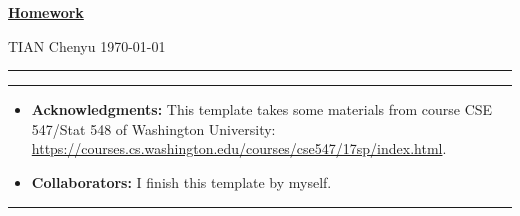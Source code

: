 \documentclass[a4paper]{article}
\begin{document}
\courseheader



\setcounter{hwcnt}{1} %

\begin{center}
  \underline{\bf Homework \thehwcnt} \\
\end{center}
\begin{flushleft}
  TIAN Chenyu\hfill
  \today
\end{flushleft}
\hrule

\vspace{2em}

\flushleft
\rule{\textwidth}{1pt}
\begin{itemize}
\item {\bf Acknowledgments: \/} 
  This template takes some materials from course CSE 547/Stat 548 of Washington University: \small{\url{https://courses.cs.washington.edu/courses/cse547/17sp/index.html}}.
\item {\bf Collaborators: \/}
  I finish this template by myself.
\end{itemize}
\rule{\textwidth}{1pt}

\vspace{2em}

\end{document}
